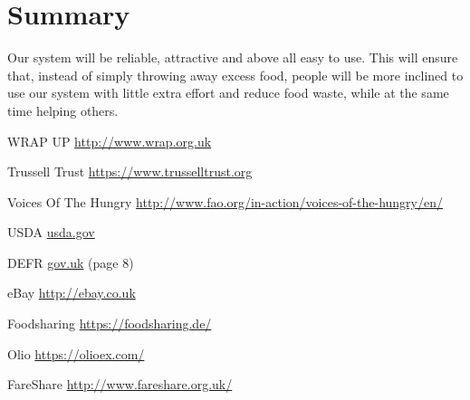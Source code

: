 \documentclass[12pt]{article}
\begin{document}
\section{Summary}

Our system will be reliable, attractive and above all easy to use. This will ensure that, instead of simply throwing away excess food, people will be more inclined to use our system with little extra effort and reduce food waste, while at the same time helping others. 

\begin{thebibliography}{1}

   WRAP UP  \href{http://www.wrap.org.uk/sites/files/wrap/Household_food_waste_in_the_UK_2015_Report.pdf}{http://www.wrap.org.uk}

   Trussell Trust \href{https://www.trusselltrust.org/2015/11/18/uk-foodbank-use-still-at-record-levels-as-hunger-remains-major-concern-for-low-income-families/}{https://www.trusselltrust.org}

   Voices Of The Hungry \href{http://www.fao.org/in-action/voices-of-the-hungry/en/}{http://www.fao.org/in-action/voices-of-the-hungry/en/}
  
   USDA \href{https://www.fsis.usda.gov/wps/portal/fsis/topics/food-safety-education/get-answers/food-safety-fact-sheets/food-labeling/food-product-dating/food-product-dating/!ut/p/a1/jVJdT8IwFP01PJYWhzB8W5YYQBkSooy9mLvtbmvStUtbmPjrLaCJGqa0T_fccz_OaWlCY5pI2PMSLFcSxDFORq9sxUaDScjmy8ngns2il9XyIQyZv751hO0fhMi7sr7jBOy_-vkVA270IlyUNGnAVoTLQtG4REtAmha1oXGhVE4MFGgPpIDMElMh2q-EgBQFl-Vn2GiV7xwndxZ1gRua_FyLDdydRd56OJ1HHlsOfxMu-HYmdBvjlJdCpadH2gYy9XwnUWOBGnV_px1cWdvc9ViPtW3brzHnGYgcuDj0M1X32HfZ-NagtkTjHkEY0lZgjxjXp49w1IXGZUGIA6kRJIG94jk5tfAm4_HQv7RFpYyl8aXptKmf4_fHYMr4U73xTfAB8mN6gw!!/#3}{usda.gov}
  
   DEFR \href{https://www.gov.uk/government/uploads/system/uploads/attachment_data/file/69316/pb132629-food-date-labelling-110915.pdf}{gov.uk} (page 8)
  
   eBay \href{http://ebay.co.uk}{http://ebay.co.uk}

   Foodsharing \href{https://foodsharing.de/}{https://foodsharing.de/}

   Olio \href{https://olioex.com/}{https://olioex.com/}
  
   FareShare \href{http://www.fareshare.org.uk/}{http://www.fareshare.org.uk/}
\end{thebibliography}
\end{document}
